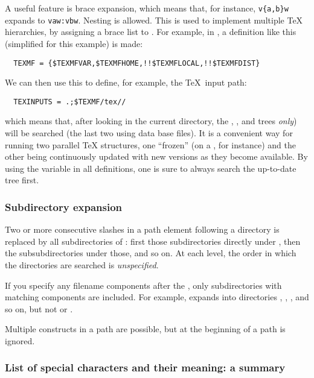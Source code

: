 \documentclass{article}
\begin{document}
A useful feature is brace expansion, which means that, for instance,
\verb+v{a,b}w+ expands to \verb+vaw:vbw+. Nesting is allowed.
This is used to implement multiple \TeX{} hierarchies, by
assigning a brace list to .
For example, in , a definition like this
(simplified for this example) is made:
\begin{verbatim}
  TEXMF = {$TEXMFVAR,$TEXMFHOME,!!$TEXMFLOCAL,!!$TEXMFDIST}
\end{verbatim}
We can then use this to define, for example, the \TeX\ input path:
\begin{verbatim}
  TEXINPUTS = .;$TEXMF/tex//
\end{verbatim}
which means that, after looking in the current directory, the
, , 
and  trees \emph{only}) will be searched (the
last two using  data base files). It is a convenient
way for running two parallel \TeX{} structures, one ``frozen'' (on a
\CD, for instance) and the other being continuously updated with new
versions as they become available.  By using the 
variable in all definitions, one is sure to always search the
up-to-date tree first.

\subsubsection{Subdirectory expansion}
\label{sec:subdirectory-expansion}

Two or more consecutive slashes in a path element following a directory
 is replaced by all subdirectories of : first those
subdirectories directly under , then the subsubdirectories under
those, and so on.  At each level, the order in which the directories are
searched is \emph{unspecified}.

If you specify any filename components after the \samp{//}, only
subdirectories with matching components are included.  For example,
 expands into directories , ,
, and so on, but not  or .

Multiple \samp{//} constructs in a path are possible, but
\samp{//} at the beginning of a path is ignored.

\subsubsection{List of special characters and their meaning: a summary}
\end{document}
